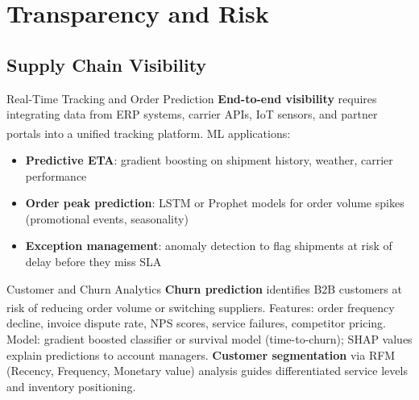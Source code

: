 \section{Transparency and Risk}

\subsection{Supply Chain Visibility}


\begin{v3topic}{Real-Time Tracking and Order Prediction}
    \textbf{End-to-end visibility} requires integrating data from ERP systems, carrier APIs, IoT sensors, and partner portals into a unified tracking platform\textsuperscript{\cite[][pp.~72--80]{chopraSupplyChainManagement2019}}.
    ML applications:
    \begin{itemize}
        \item \textbf{Predictive ETA}: gradient boosting on shipment history, weather, carrier performance
        \item \textbf{Order peak prediction}: LSTM or Prophet models for order volume spikes (promotional events, seasonality)
        \item \textbf{Exception management}: anomaly detection to flag shipments at risk of delay before they miss SLA
    \end{itemize}

\end{v3topic}
\begin{v3topic}{Customer and Churn Analytics}
    \textbf{Churn prediction} identifies B2B customers at risk of reducing order volume or switching suppliers\textsuperscript{\cite[][p.~85]{chopraSupplyChainManagement2019}}.
    Features: order frequency decline, invoice dispute rate, NPS scores, service failures, competitor pricing.
    Model: gradient boosted classifier or survival model (time-to-churn); SHAP values explain predictions to account managers.
    \textbf{Customer segmentation} via RFM (Recency, Frequency, Monetary value) analysis guides differentiated service levels and inventory positioning.

\end{v3topic}

